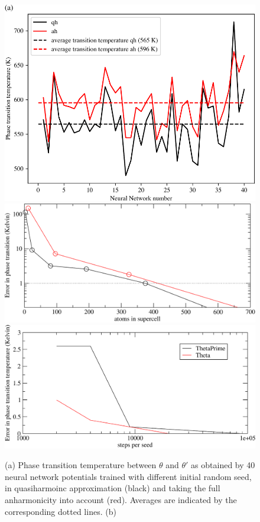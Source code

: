 \documentclass{article}
\begin{document}
\begin{figure}[H]
    \includegraphics[width=\columnwidth     ]{albert_figures/alle-crop.pdf}
    \includegraphics[width=0.5\columnwidth]{albert_figures/convergence_atoms_in_supercell-crop.pdf}
    \includegraphics[width=0.5\columnwidth ]{albert_figures/convergence_steps-crop.pdf}
    \caption{(a) Phase transition temperature between $\theta$ and $\theta'$ as obtained by 40 neural network potentials trained with different initial random seed, in quasiharmoinc approximation (black) and taking the full anharmonicity into account (red). Averages are indicated by the corresponding dotted lines. (b)  } 
    \label{fig2}
\end{figure}
\end{document}
